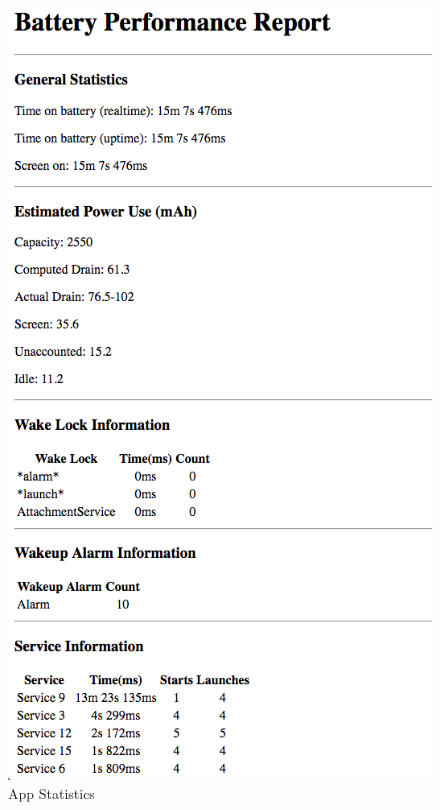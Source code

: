 \begin{figure}[!h]
 	\begin{center}
		\includegraphics[scale=0.6]{reporter1}
		\caption{App Statistics}
	\end{center}
\end{figure}
\pagebreak

